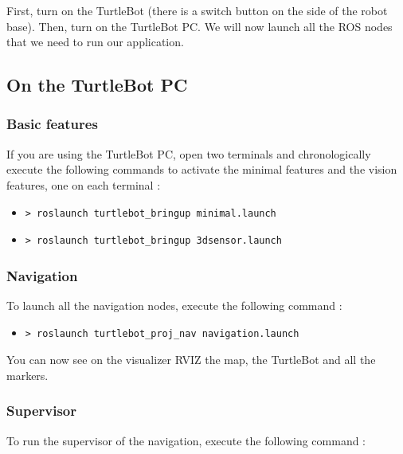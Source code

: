 \documentclass[10pt,a4paper]{article}
\begin{document}
First, turn on the TurtleBot (there is a switch button on the side of the robot base). Then, turn on the TurtleBot PC. We will now launch all the ROS nodes that we need to run our application.

\subsection{On the TurtleBot PC}

\subsubsection{Basic features}

If you are using the TurtleBot PC, open two terminals and chronologically execute the following commands to activate the minimal features and the vision features, one on each terminal :

\begin{itemize}
\item[]  \begin{verbatim}> roslaunch turtlebot_bringup minimal.launch \end{verbatim}
\item[]  \begin{verbatim}> roslaunch turtlebot_bringup 3dsensor.launch \end{verbatim}
\end{itemize}

\subsubsection{Navigation}

To launch all the navigation nodes, execute the following command :

\begin{itemize}
\item[]  \begin{verbatim}> roslaunch turtlebot_proj_nav navigation.launch \end{verbatim}
\end{itemize}

You can now see on the visualizer RVIZ the map, the TurtleBot and all the markers.

\subsubsection{Supervisor}

To run the supervisor of the navigation, execute the following command :
\end{document}
